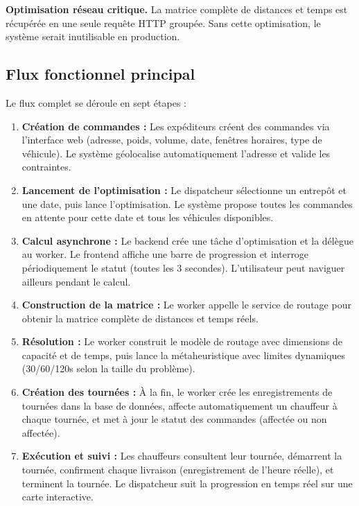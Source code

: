 \documentclass[12pt,a4paper]{report}
\begin{document}
\textbf{Optimisation réseau critique.} La matrice complète de distances et temps est récupérée en une seule requête HTTP groupée. Sans cette optimisation, le système serait inutilisable en production.

\subsection{Flux fonctionnel principal}

Le flux complet se déroule en sept étapes :

\begin{enumerate}[leftmargin=2.2em]
    \item \textbf{Création de commandes :} Les expéditeurs créent des commandes via l'interface web (adresse, poids, volume, date, fenêtres horaires, type de véhicule). Le système géolocalise automatiquement l'adresse et valide les contraintes.

    \item \textbf{Lancement de l'optimisation :} Le dispatcheur sélectionne un entrepôt et une date, puis lance l'optimisation. Le système propose toutes les commandes en attente pour cette date et tous les véhicules disponibles.

    \item \textbf{Calcul asynchrone :} Le backend crée une tâche d'optimisation et la délègue au worker. Le frontend affiche une barre de progression et interroge périodiquement le statut (toutes les 3 secondes). L'utilisateur peut naviguer ailleurs pendant le calcul.

    \item \textbf{Construction de la matrice :} Le worker appelle le service de routage pour obtenir la matrice complète de distances et temps réels.

    \item \textbf{Résolution :} Le worker construit le modèle de routage avec dimensions de capacité et de temps, puis lance la métaheuristique avec limites dynamiques (30/60/120s selon la taille du problème).

    \item \textbf{Création des tournées :} À la fin, le worker crée les enregistrements de tournées dans la base de données, affecte automatiquement un chauffeur à chaque tournée, et met à jour le statut des commandes (affectée ou non affectée).

    \item \textbf{Exécution et suivi :} Les chauffeurs consultent leur tournée, démarrent la tournée, confirment chaque livraison (enregistrement de l'heure réelle), et terminent la tournée. Le dispatcheur suit la progression en temps réel sur une carte interactive.
\end{enumerate}
\end{document}
